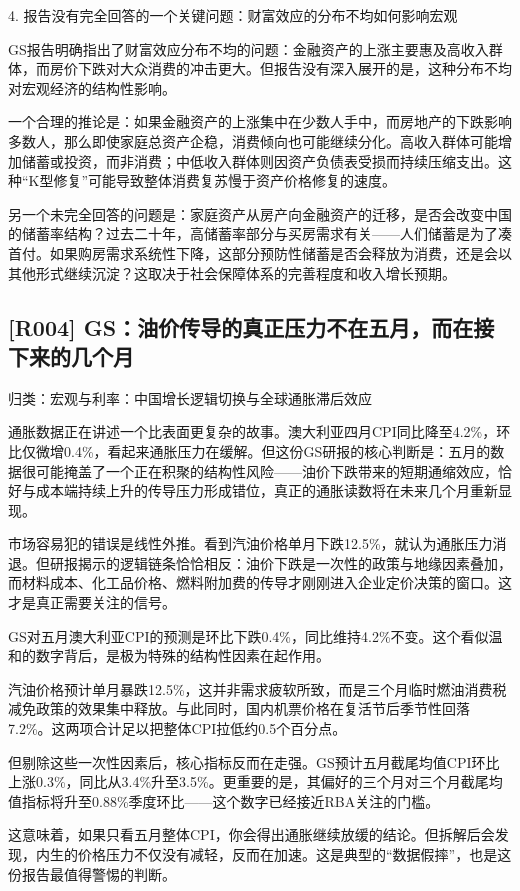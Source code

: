 \documentclass[11pt]{ctexart}
\begin{document}
4. 报告没有完全回答的一个关键问题：财富效应的分布不均如何影响宏观

GS报告明确指出了财富效应分布不均的问题：金融资产的上涨主要惠及高收入群体，而房价下跌对大众消费的冲击更大。但报告没有深入展开的是，这种分布不均对宏观经济的结构性影响。

一个合理的推论是：如果金融资产的上涨集中在少数人手中，而房地产的下跌影响多数人，那么即使家庭总资产企稳，消费倾向也可能继续分化。高收入群体可能增加储蓄或投资，而非消费；中低收入群体则因资产负债表受损而持续压缩支出。这种“K型修复”可能导致整体消费复苏慢于资产价格修复的速度。

另一个未完全回答的问题是：家庭资产从房产向金融资产的迁移，是否会改变中国的储蓄率结构？过去二十年，高储蓄率部分与买房需求有关——人们储蓄是为了凑首付。如果购房需求系统性下降，这部分预防性储蓄是否会释放为消费，还是会以其他形式继续沉淀？这取决于社会保障体系的完善程度和收入增长预期。

\subsection{[R004] GS：油价传导的真正压力不在五月，而在接下来的几个月}
{\small\color{refgray}归类：宏观与利率：中国增长逻辑切换与全球通胀滞后效应}

通胀数据正在讲述一个比表面更复杂的故事。澳大利亚四月CPI同比降至4.2\%，环比仅微增0.4\%，看起来通胀压力在缓解。但这份GS研报的核心判断是：五月的数据很可能掩盖了一个正在积聚的结构性风险——油价下跌带来的短期通缩效应，恰好与成本端持续上升的传导压力形成错位，真正的通胀读数将在未来几个月重新显现。

市场容易犯的错误是线性外推。看到汽油价格单月下跌12.5\%，就认为通胀压力消退。但研报揭示的逻辑链条恰恰相反：油价下跌是一次性的政策与地缘因素叠加，而材料成本、化工品价格、燃料附加费的传导才刚刚进入企业定价决策的窗口。这才是真正需要关注的信号。

GS对五月澳大利亚CPI的预测是环比下跌0.4\%，同比维持4.2\%不变。这个看似温和的数字背后，是极为特殊的结构性因素在起作用。

汽油价格预计单月暴跌12.5\%，这并非需求疲软所致，而是三个月临时燃油消费税减免政策的效果集中释放。与此同时，国内机票价格在复活节后季节性回落7.2\%。这两项合计足以把整体CPI拉低约0.5个百分点。

但剔除这些一次性因素后，核心指标反而在走强。GS预计五月截尾均值CPI环比上涨0.3\%，同比从3.4\%升至3.5\%。更重要的是，其偏好的三个月对三个月截尾均值指标将升至0.88\%季度环比——这个数字已经接近RBA关注的门槛。

这意味着，如果只看五月整体CPI，你会得出通胀继续放缓的结论。但拆解后会发现，内生的价格压力不仅没有减轻，反而在加速。这是典型的“数据假摔”，也是这份报告最值得警惕的判断。
\end{document}
